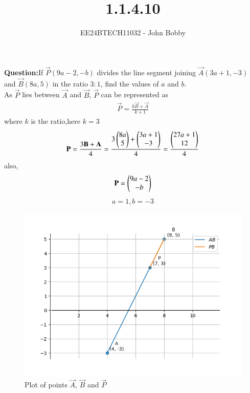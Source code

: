 \documentclass[journal]{IEEEtran}
\begin{document}

\vspace{3cm}
\title{1.1.4.10}
\author{EE24BTECH11032 - John Bobby
}
{\let\newpage\relax\maketitle}

\renewcommand{\thefigure}{\theenumi}
\renewcommand{\thetable}{\theenumi}
\setlength{\intextsep}{10pt} %


\renewcommand{\thetable}{\theenumi}
 \textbf{Question:}If $\vec{P}(9a-2,-b)$ divides the line segment joining $\vec{A}(3a+1,-3)$ and $\vec{B}(8a,5)$  
		in the ratio $3:1$, find the values of $a$ and $b$.\\
 
 \solution As $\vec{P}$ lies between $\vec{A}$ and $\vec{B}$, $\vec{P}$ can be represented as  
 \begin{align}
		\vec{P}=\frac{k\vec{B}+\vec{A}}{k+1} 
 \end{align}
		where $k$ is the ratio,here $k=3$
 \begin{align}
		\mathbf{P}=\frac{3\mathbf{B}+\mathbf{A}}{4}=\frac{3\begin{pmatrix}8a\\5\end{pmatrix}+\begin{pmatrix}3a+1\\-3\end{pmatrix}}{4}=\frac{\begin{pmatrix}27a+1\\12\end{pmatrix}}{4}
 \end{align}
		also,
 \begin{align}
		\mathbf{P}=\begin{pmatrix}9a-2\\-b\end{pmatrix}
 \end{align}
 \begin{align}
        	a=1, b=-3
\end{align}
		


		\begin{figure}[h!]
                \centering
               \includegraphics[width=0.7\linewidth]{Figs/Fig1.png}
			\caption{Plot of points $\vec{A}$, $\vec{B}$ and $\vec{P}$}
               \label{stemplot}
               \end{figure}
\end{document}
